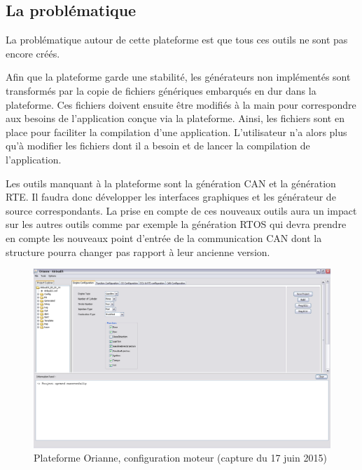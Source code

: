 \subsection{La problématique}

La problématique autour de cette plateforme est que tous ces outils ne sont pas encore créés.

Afin que la plateforme garde une stabilité, les générateurs non implémentés sont transformés par la copie de fichiers génériques embarqués en dur dans la plateforme. Ces fichiers doivent ensuite être modifiés à la main pour correspondre aux besoins de l'application conçue via la plateforme. Ainsi, les fichiers sont en place pour faciliter la compilation d'une application. L'utilisateur n'a alors plus qu'à modifier les fichiers dont il a besoin et de lancer la compilation de l'application.

Les outils manquant à la plateforme sont la génération CAN et la génération RTE. Il faudra donc développer les interfaces graphiques et les générateur de source correspondants. La prise en compte de ces nouveaux outils aura un impact sur les autres outils comme par exemple la génération RTOS qui devra prendre en compte les nouveaux point d'entrée de la communication CAN dont la structure pourra changer pas rapport à leur ancienne version.

\begin{figure}[h]
  \centering
  \includegraphics[angle=-90, scale=0.5]{images/plateforme}
  \caption{Plateforme Orianne, configuration moteur (capture du 17 juin 2015)}
  \label{fig:plateform}
\end{figure}

